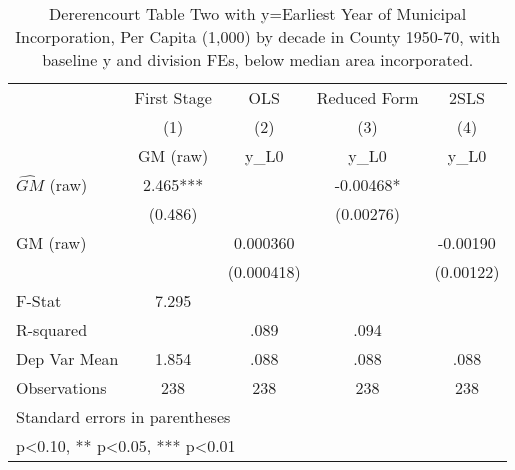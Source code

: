\begin{table}[htbp]\centering
\def\sym#1{\ifmmode^{#1}\else\(^{#1}\)\fi}
\caption{Dererencourt Table Two with y=Earliest Year of Municipal Incorporation, Per Capita (1,000) by decade in County 1950-70, with baseline y and division FEs, below median area incorporated.}
\begin{tabular}{l*{4}{c}}
\toprule
                    & First Stage   &         OLS   &Reduced Form   &        2SLS   \\
                    &\multicolumn{1}{c}{(1)}&\multicolumn{1}{c}{(2)}&\multicolumn{1}{c}{(3)}&\multicolumn{1}{c}{(4)}\\
                    &\multicolumn{1}{c}{GM  (raw)}&\multicolumn{1}{c}{y\_L0}&\multicolumn{1}{c}{y\_L0}&\multicolumn{1}{c}{y\_L0}\\
\midrule
$\hat{GM}$ (raw)    &       2.465***&               &    -0.00468*  &               \\
                    &     (0.486)   &               &   (0.00276)   &               \\
\addlinespace
GM  (raw)           &               &    0.000360   &               &    -0.00190   \\
                    &               &  (0.000418)   &               &   (0.00122)   \\
\midrule
F-Stat              &       7.295   &               &               &               \\
R-squared           &               &        .089   &        .094   &               \\
Dep Var Mean        &       1.854   &        .088   &        .088   &        .088   \\
Observations        &         238   &         238   &         238   &         238   \\
\bottomrule
\multicolumn{5}{l}{\footnotesize Standard errors in parentheses}\\
\multicolumn{5}{l}{\footnotesize * p<0.10, ** p<0.05, *** p<0.01}\\
\end{tabular}
\end{table}
